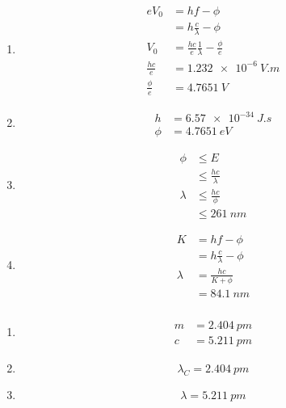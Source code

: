\documentclass{article}
\begin{document}
\begin{enumerate}
  \item

        \begin{align*}
          e V_0          & = h f - \phi                                       \\
                         & = h \frac{c}{\lambda} - \phi                       \\
          V_0            & = \frac{h c}{e} \frac{1}{\lambda} - \frac{\phi}{e} \\
          \frac{h c}{e}  & = \qty{1.232e-6}{V.m}                              \\
          \frac{\phi}{e} & = \qty{4.7651}{V}
        \end{align*}

  \item

        \begin{align*}
          h    & = \qty{6.57e-34}{J.s} \\
          \phi & = \qty{4.7651}{eV}
        \end{align*}

  \item

        \begin{align*}
          \phi    & \le E                   \\
                  & \le \frac{h c}{\lambda} \\
          \lambda & \le \frac{h c}{\phi}    \\
                  & \le \qty{261}{nm}
        \end{align*}

  \item

        \begin{align*}
          K       & = h f - \phi                 \\
                  & = h \frac{c}{\lambda} - \phi \\
          \lambda & = \frac{h c}{K + \phi}       \\
                  & = \qty{84.1}{nm}
        \end{align*}
\end{enumerate}

\setcounter{subsubsection}{38}
\subsubsection{}

\begin{enumerate}
  \item

        \begin{align*}
          m & = \qty{2.404}{pm} \\
          c & = \qty{5.211}{pm}
        \end{align*}

  \item \[\lambda_C = \qty{2.404}{pm}\]

  \item \[\lambda = \qty{5.211}{pm}\]
\end{enumerate}
\end{document}
